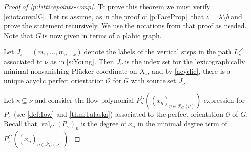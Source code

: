 \documentclass{amsart}
\theoremstyle{definition}
\numberwithin{equation}{section}
\newcommand{\pathsw}[1]{L^\swarrow_{#1}}
\newcommand{\rect}{\mathrm{rec}}
\def\O{\mathcal{O}}
\newcommand{\val}{{\operatorname{val}}}
\begin{document}
\begin{proof}[Proof of 
	\cref{p:latticepoints-comp}] To prove this theorem we must verify \eqref{e:iotaonvalG}.
Let us assume, as in the proof of \cref{p:FaceProp}, that $\nu=\lambda\setminus b$ and prove the statement recursively. We use the notations from that proof as needed. Note that $G$ is now given in terms of a plabic graph.

Let $J_\nu=(m_1,\dotsc, m_{n-k})$ denote the labels of the vertical 
steps in the path $\pathsw{\nu}$ associated to $\nu$ as in \cref{s:Young}.
Then $J_\nu$ is the index set for the lexicographically minimal nonvanishing Pl\"ucker
coordinate on $X_{\nu}$, and by \cref{acyclic},
	there is a unique acyclic perfect orientation $\O$ for $G$ with source set $J_{\nu}$.


Let $\kappa\subseteq\nu$ and 
consider the flow polynomial $P^G_\kappa((x_\eta)_{\eta\in\mathcal P_G(\nu)})$ 
expression for $P_\kappa$ (see \cref{def:flow} and \cref{thm:Talaska}) associated to 
the perfect orientation $\O$ of $G$.
	Recall that $\val_G(P_\kappa)_\eta$ is the degree of $x_\eta$ in the minimal degree term of  $P^G_\kappa((x_\eta)_{\eta\in\mathcal P_G(\nu)})$.




\end{proof}
\end{document}
